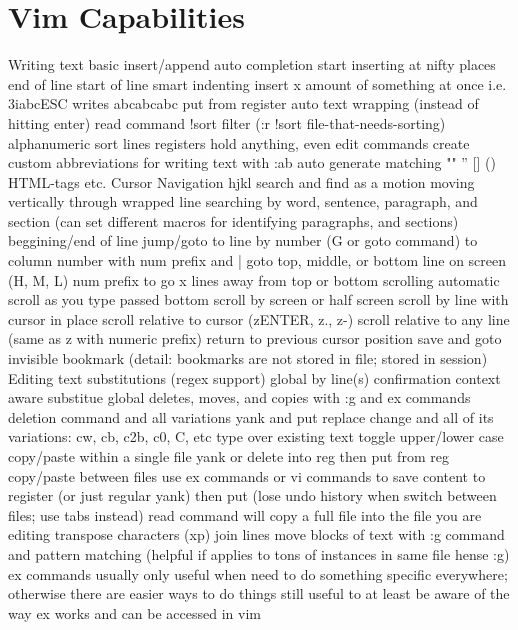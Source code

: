 \documentclass[12pt]{book}
\begin{document}
\section{Vim Capabilities}
Writing text
  basic insert/append
  auto completion
  start inserting at nifty places 
    end of line
    start of line
    smart indenting
  insert x amount of something at once i.e. 3iabcESC writes abcabcabc
  put from register
  auto text wrapping (instead of hitting enter)
  read command
    !sort filter (:r !sort file-that-needs-sorting)
  alphanumeric sort lines
  registers hold anything, even edit commands 
  create custom abbreviations for writing text with :ab
  auto generate matching "" '' [] {} () HTML-tags etc.
Cursor Navigation 
  hjkl
  search and find as a motion
  moving vertically through wrapped line
  searching
  by word, sentence, paragraph, and section (can set different macros for identifying paragraphs, and sections)
  beggining/end of line
  jump/goto 
    to line by number (G or goto command)
    to column number with num prefix and |
    goto top, middle, or bottom line on screen (H, M, L) num prefix to go x lines away from top or bottom
  scrolling
    automatic scroll as you type passed bottom
    scroll by screen or half screen
    scroll by line with cursor in place
    scroll relative to cursor (zENTER, z., z-)
    scroll relative to any line (same as z with numeric prefix)
  return to previous cursor position
  save and goto invisible bookmark (detail: bookmarks are not stored in file; stored in session)
Editing text
  substitutions (regex support)
    global
    by line(s)
    confirmation
    context aware substitue
  global deletes, moves, and copies with :g and ex commands
  deletion command and all variations
  yank and put
  replace
    change and all of its variations: cw, cb, c2b, c0, C, etc 
    type over existing text
  toggle upper/lower case
  copy/paste within a single file
    yank or delete into reg then put from reg
  copy/paste between files
    use ex commands or vi commands to save content to register (or just regular yank) then put (lose undo history when switch between files; use tabs instead)
    read command will copy a full file into the file you are editing
  transpose characters (xp)
  join lines
  move blocks of text
    with :g command and pattern matching (helpful if applies to tons of instances in same file hense :g)
  ex commands
    usually only useful when need to do something specific everywhere; otherwise there are easier ways to do things
    still useful to at least be aware of the way ex works and can be accessed in vim
\end{document}
